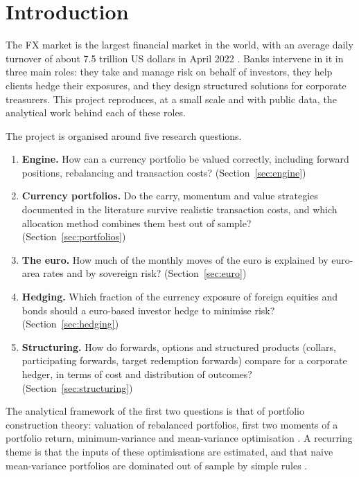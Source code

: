 \section{Introduction}\label{sec:intro}

The FX market is the largest financial market in the world, with an average daily turnover of about 7.5 trillion US dollars in April 2022 \citep{bis2022}.
Banks intervene in it in three main roles: they take and manage risk on behalf of investors, they help clients hedge their exposures, and they design structured solutions for corporate treasurers.
This project reproduces, at a small scale and with public data, the analytical work behind each of these roles.

The project is organised around five research questions.

\begin{enumerate}
  \item \textbf{Engine.} How can a currency portfolio be valued correctly, including forward positions, rebalancing and transaction costs? (Section~\ref{sec:engine})
  \item \textbf{Currency portfolios.} Do the carry, momentum and value strategies documented in the literature \citep{lustig2011,menkhoff2012carry,menkhoff2012momentum,asness2013} survive realistic transaction costs, and which allocation method combines them best out of sample? (Section~\ref{sec:portfolios})
  \item \textbf{The euro.} How much of the monthly moves of the euro is explained by euro-area rates and by sovereign risk? (Section~\ref{sec:euro})
  \item \textbf{Hedging.} Which fraction of the currency exposure of foreign equities and bonds should a euro-based investor hedge to minimise risk? \citep{campbell2010} (Section~\ref{sec:hedging})
  \item \textbf{Structuring.} How do forwards, options and structured products (collars, participating forwards, target redemption forwards) compare for a corporate hedger, in terms of cost and distribution of outcomes? (Section~\ref{sec:structuring})
\end{enumerate}

The analytical framework of the first two questions is that of portfolio construction theory: valuation of rebalanced portfolios, first two moments of a portfolio return, minimum-variance and mean-variance optimisation \citep{markowitz1952,milhau2026}.
A recurring theme is that the inputs of these optimisations are estimated, and that naive mean-variance portfolios are dominated out of sample by simple rules \citep{demiguel2009}.

